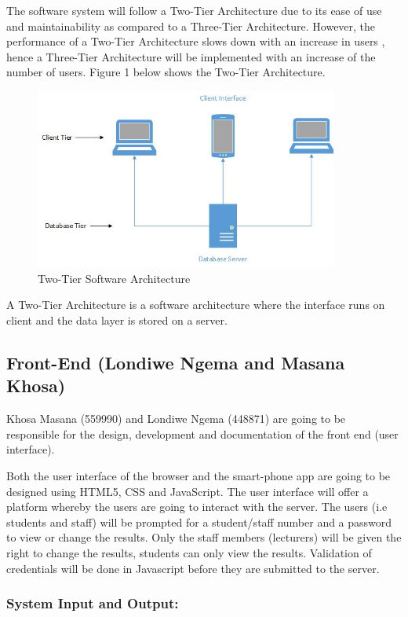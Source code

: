 \documentclass[10pt,onecolumn]{RequimentsGathering}
\begin{document}
	The software system will follow a Two-Tier Architecture due to its ease of use and maintainability as compared to a Three-Tier Architecture. However, the performance of a Two-Tier Architecture slows down with an increase in users \cite{ref3}, hence a Three-Tier Architecture will be implemented with an increase of the number of users. Figure 1 below shows the Two-Tier Architecture.   
	\begin{center}
		\begin{figure}[h]
			\centering
			\includegraphics[width=10cm]{Two-Tier}
			\caption{Two-Tier Software Architecture}
		\end{figure}
	\end{center}
	
	
	A Two-Tier Architecture is a software architecture where the interface runs on client and the data layer is stored on a server\cite{ref4}.
	\subsection{Front-End (Londiwe Ngema and Masana Khosa)}
	
	Khosa Masana (559990) and Londiwe Ngema (448871) are going to be responsible for the design, development and documentation of the front end (user interface).
	
	Both the user interface of the browser and the smart-phone app are going to be designed using HTML5, CSS and JavaScript. The user interface will offer a platform whereby the users are going to interact with the server. The users (i.e students and staff) will be prompted for a student/staff number and a password to view or change the results. Only the staff members (lecturers) will be given the right to change the results, students can only view the results. Validation of credentials will be done in Javascript before they are submitted to the server.  
	
	\subsubsection{System Input and Output:} 
	
\end{document}
